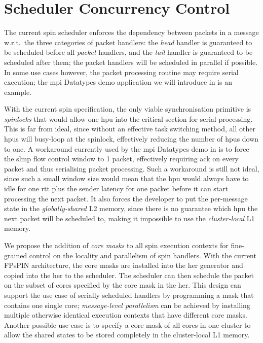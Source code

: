 \section{Scheduler Concurrency Control} \label{sec:sched-concurrency-ctrl}

The current \ac{spin} scheduler enforces the dependency between packets in a message w.r.t.\ the three categories of packet handlers: the \emph{head} handler is guaranteed to be scheduled before all \emph{packet} handlers, and the \emph{tail} handler is guaranteed to be scheduled after them; the packet handlers will be scheduled in parallel if possible.  In some use cases however, the packet processing routine may require serial execution; the \ac{mpi} Datatypes demo application we will introduce in  is an example.

With the current \ac{spin} specification, the only viable synchronisation primitive is \emph{spinlocks} that would allow one \ac{hpu} into the critical section for serial processing.  This is far from ideal, since without an effective task switching method, all other \ac{hpu}s will busy-loop at the spinlock, effectively reducing the number of \ac{hpu}s down to one.  A workaround currently used by the \ac{mpi} Datatypes demo in  is to force the \ac{slmp} flow control window to 1 packet, effectively requiring \ac{ack} on every packet and thus serialising packet processing.  Such a workaround is still not ideal, since such a small window size would mean that the \ac{hpu} would always have to idle for one \ac{rtt} plus the sender latency for one packet before it can start processing the next packet.  It also forces the developer to put the per-message state in the \emph{globally-shared} L2 memory, since there is no guarantee which \ac{hpu} the next packet will be scheduled to, making it impossible to use the \emph{cluster-local} L1 memory.

We propose the addition of \emph{core masks} to all \ac{spin} execution contexts for fine-grained control on the locality and parallelism of \ac{spin} handlers.  With the current FPsPIN architecture, the core masks are installed into the \ac{her} generator and copied into the \ac{her} to the scheduler.  The scheduler can then schedule the packet on the subset of cores specified by the core mask in the \ac{her}.  This design can support the use case of serially scheduled handlers by programming a mask that contains one single core; \emph{message-level parallelism} can be achieved by installing multiple otherwise identical execution contexts that have different core masks.  Another possible use case is to specify a core mask of all cores in one cluster to allow the shared states to be stored completely in the cluster-local L1 memory.

